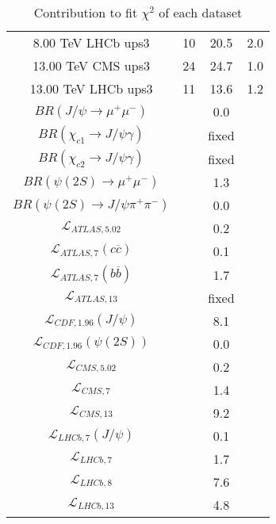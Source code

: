 \begin{table}[h!]
\begin{tabular}{c|c|c|c}
8.00 TeV LHCb ups3 & 10 & 20.5 & 2.0 \\
13.00 TeV CMS ups3 & 24 & 24.7 & 1.0 \\
13.00 TeV LHCb ups3 & 11 & 13.6 & 1.2 \\
\hline
$BR(J/\psi\rightarrow\mu^+\mu^-)$ &  & 0.0 &  \\
$BR(\chi_{c1}\rightarrow J/\psi\gamma)$ &  & fixed & \\
$BR(\chi_{c2}\rightarrow J/\psi\gamma)$ &  & fixed & \\
$BR(\psi(2S)\rightarrow\mu^+\mu^-)$ &  & 1.3 &  \\
$BR(\psi(2S)\rightarrow J/\psi\pi^+\pi^-)$ &  & 0.0 &  \\
$\mathcal L_{ATLAS,5.02}$ &  & 0.2 &  \\
$\mathcal L_{ATLAS,7}(c\overline c)$ &  & 0.1 &  \\
$\mathcal L_{ATLAS,7}(b\overline b)$ &  & 1.7 &  \\
$\mathcal L_{ATLAS,13}$ &  & fixed & \\
$\mathcal L_{CDF,1.96}(J/\psi)$ &  & 8.1 &  \\
$\mathcal L_{CDF,1.96}(\psi(2S))$ &  & 0.0 &  \\
$\mathcal L_{CMS,5.02}$ &  & 0.2 &  \\
$\mathcal L_{CMS,7}$ &  & 1.4 &  \\
$\mathcal L_{CMS,13}$ &  & 9.2 &  \\
$\mathcal L_{LHCb,7}(J/\psi)$ &  & 0.1 &  \\
$\mathcal L_{LHCb,7}$ &  & 1.7 &  \\
$\mathcal L_{LHCb,8}$ &  & 7.6 &  \\
$\mathcal L_{LHCb,13}$ &  & 4.8 &  \\
\end{tabular}
\caption{Contribution to fit $\chi^2$ of each dataset}
\end{table}
